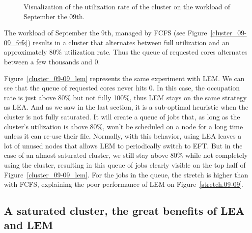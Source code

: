\documentclass[conference,10pt]{IEEEtran}
\begin{document}
\begin{figure}[tb]
\begin{subfigure}[b]{0.49\linewidth}
\end{subfigure}
\caption{Visualization of the utilization rate of the cluster on the workload of September the 09th.}\end{figure}

The workload of September the 9th, managed by FCFS (see Figure~\ref{cluster_09-09_fcfs})
results in a cluster that alternates between full utilization and an approximately 80\% utilization rate.
Thus the queue of requested cores alternates between a few thousands and 0.

Figure~\ref{cluster_09-09_lem} represents the same experiment with LEM.
We can see that the queue of requested cores never hits 0.
In this case, the occupation rate is just above 80\% but not fully
100\%, thus LEM stays on the same strategy as LEA.
And as we saw in the last section, it is a sub-optimal heuristic when the cluster is not fully saturated.
It will create a queue of jobs that, as long as the cluster's utilization is above 80\%, won't
be scheduled on a node for a long time unless it can re-use their file.
Normally, with this behavior, using LEA leaves a lot of unused nodes that allows LEM
to periodically switch to EFT. But in the case of an almost 
saturated cluster, we still stay above 80\% while not completely using the cluster,
resulting in this queue of jobs clearly visible on the top half of Figure~\ref{cluster_09-09_lem}.
For the jobs in the queue, the stretch is higher than with FCFS, explaining the poor performance of
LEM on Figure~\ref{stretch.09-09}.

\subsection{A saturated cluster, the great benefits of LEA and LEM}\label{sec.03-26}
\end{document}
